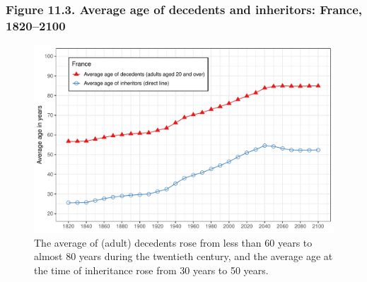 \documentclass[t]{beamer}\usepackage[]{graphicx}\usepackage[]{color}
\newenvironment{knitrout}{}{} %
\begin{document}
\begin{frame}[label=Figure_11_3]
\frametitle{Figure 11.3. Average age of decedents and inheritors: France, 1820--2100}
\begin{figure}[t]
\begin{minipage}[b]{\textwidth}
\centering
\begin{knitrout}\footnotesize
{}\color{fgcolor}

{\centering \includegraphics[width=1\linewidth]{figures/color/Figure_11_3} 

}



\end{knitrout}
\caption{The average of (adult) decedents rose from less than 60 years to almost 80 years during the twentieth century, and the average age at the time of inheritance rose from 30 years to 50 years.}
\end{minipage}
\end{figure}
\end{frame}
\end{document}
